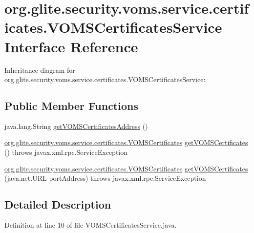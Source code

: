 \hypertarget{interfaceorg_1_1glite_1_1security_1_1voms_1_1service_1_1certificates_1_1VOMSCertificatesService}{
\section{org.glite.security.voms.service.certificates.VOMSCertificatesService Interface Reference}
\label{interfaceorg_1_1glite_1_1security_1_1voms_1_1service_1_1certificates_1_1VOMSCertificatesService}
}


Inheritance diagram for org.glite.security.voms.service.certificates.VOMSCertificatesService:
\subsection*{Public Member Functions}
\begin{DoxyCompactItemize}
\item 
java.lang.String \hyperlink{interfaceorg_1_1glite_1_1security_1_1voms_1_1service_1_1certificates_1_1VOMSCertificatesService_a19921fdf4f7eb4fe7ed3fb3852a92745}{getVOMSCertificatesAddress} ()
\item 
\hyperlink{interfaceorg_1_1glite_1_1security_1_1voms_1_1service_1_1certificates_1_1VOMSCertificates}{org.glite.security.voms.service.certificates.VOMSCertificates} \hyperlink{interfaceorg_1_1glite_1_1security_1_1voms_1_1service_1_1certificates_1_1VOMSCertificatesService_a3bfd85c27f7196c222bfe6a7635a5abe}{getVOMSCertificates} ()  throws javax.xml.rpc.ServiceException
\item 
\hyperlink{interfaceorg_1_1glite_1_1security_1_1voms_1_1service_1_1certificates_1_1VOMSCertificates}{org.glite.security.voms.service.certificates.VOMSCertificates} \hyperlink{interfaceorg_1_1glite_1_1security_1_1voms_1_1service_1_1certificates_1_1VOMSCertificatesService_aba38b382d3921f7cbe8468ad3449de3f}{getVOMSCertificates} (java.net.URL portAddress)  throws javax.xml.rpc.ServiceException
\end{DoxyCompactItemize}


\subsection{Detailed Description}


Definition at line 10 of file VOMSCertificatesService.java.



